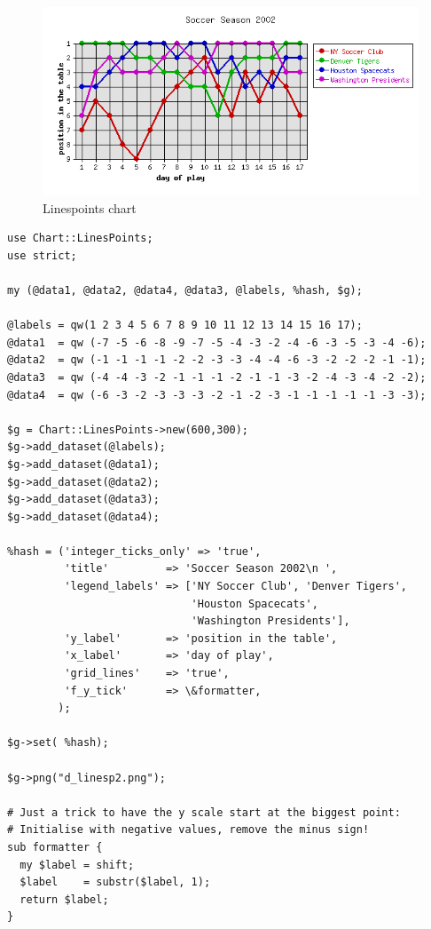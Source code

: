 \example
\begin{figure}[ht]
  \begin{center}
    \includegraphics[scale=0.6]{d_linesp2.png}
  \end{center}
  \caption{Linespoints chart}
  \label{fig:d_linesp2}
\end{figure}
\begin{verbatim}
use Chart::LinesPoints;
use strict;

my (@data1, @data2, @data4, @data3, @labels, %hash, $g);

@labels = qw(1 2 3 4 5 6 7 8 9 10 11 12 13 14 15 16 17);
@data1  = qw (-7 -5 -6 -8 -9 -7 -5 -4 -3 -2 -4 -6 -3 -5 -3 -4 -6);
@data2  = qw (-1 -1 -1 -1 -2 -2 -3 -3 -4 -4 -6 -3 -2 -2 -2 -1 -1);
@data3  = qw (-4 -4 -3 -2 -1 -1 -1 -2 -1 -1 -3 -2 -4 -3 -4 -2 -2);
@data4  = qw (-6 -3 -2 -3 -3 -3 -2 -1 -2 -3 -1 -1 -1 -1 -1 -3 -3);

$g = Chart::LinesPoints->new(600,300);
$g->add_dataset(@labels);
$g->add_dataset(@data1);
$g->add_dataset(@data2);
$g->add_dataset(@data3);
$g->add_dataset(@data4);

%hash = ('integer_ticks_only' => 'true',
         'title'         => 'Soccer Season 2002\n ',
         'legend_labels' => ['NY Soccer Club', 'Denver Tigers',
                             'Houston Spacecats',
                             'Washington Presidents'],
         'y_label'       => 'position in the table',
         'x_label'       => 'day of play',
         'grid_lines'    => 'true',
         'f_y_tick'      => \&formatter,
        );

$g->set( %hash);

$g->png("d_linesp2.png");

# Just a trick to have the y scale start at the biggest point:
# Initialise with negative values, remove the minus sign!
sub formatter {
  my $label = shift;
  $label    = substr($label, 1);
  return $label;
}

\end{verbatim}

